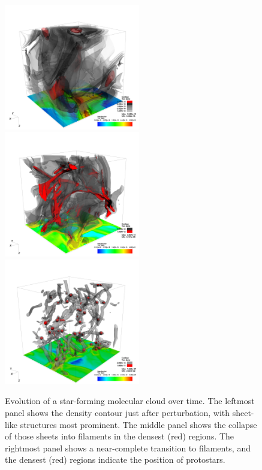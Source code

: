 \documentclass{emulateapj}
\begin{document}
\begin{figure}[ht]
	\begin{center}
	\includegraphics[height=5.5cm,clip=true]{Graphics/bbb_0375_dens_contour_00500000.png}%
	\includegraphics[height=5.5cm,clip=true]{Graphics/bbb_0375_dens_contour_0200_0002.png}%
	\includegraphics[height=5.5cm,clip=true]{Graphics/bbb_0375_dens_contour0000.png}
	\end{center}
	\caption{Evolution of a star-forming molecular cloud over time. The leftmost panel shows the density contour just after perturbation, with sheet-like structures most prominent. The middle panel shows the collapse of those sheets into filaments in the densest (red) regions. The rightmost panel shows a near-complete transition to filaments, and the densest (red) regions indicate the position of protostars.}
	\label{f:cloudevolution}
	\end{figure}
\end{document}
